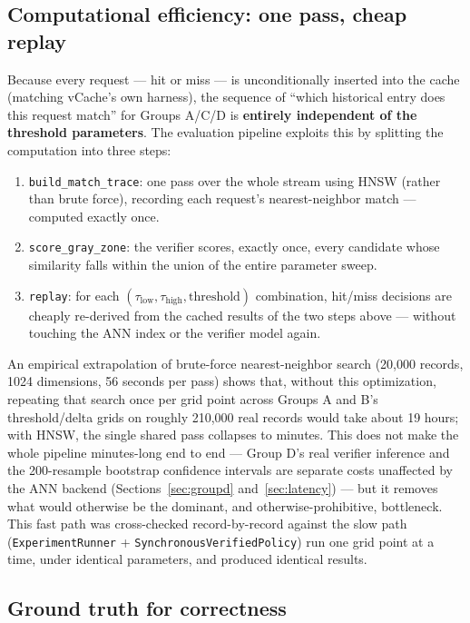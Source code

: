 \documentclass[11pt]{article}
\newcommand{\taulow}{\ensuremath{\tau_{\text{low}}}}
\newcommand{\tauhigh}{\ensuremath{\tau_{\text{high}}}}
\begin{document}
\subsection{Computational efficiency: one pass, cheap replay}

Because every request --- hit or miss --- is unconditionally inserted into the cache (matching vCache's own harness), the sequence of ``which historical entry does this request match'' for Groups A/C/D is \textbf{entirely independent of the threshold parameters}. The evaluation pipeline exploits this by splitting the computation into three steps:

\begin{enumerate}[leftmargin=*]
  \item \texttt{build\_\allowbreak{}match\_\allowbreak{}trace}: one pass over the whole stream using HNSW (rather than brute force), recording each request's nearest-neighbor match --- computed exactly once.
  \item \texttt{score\_\allowbreak{}gray\_\allowbreak{}zone}: the verifier scores, exactly once, every candidate whose similarity falls within the union of the entire parameter sweep.
  \item \texttt{replay}: for each $(\taulow, \tauhigh, \text{threshold})$ combination, hit/miss decisions are cheaply re-derived from the cached results of the two steps above --- without touching the ANN index or the verifier model again.
\end{enumerate}

An empirical extrapolation of brute-force nearest-neighbor search (20{,}000 records, 1024 dimensions, 56 seconds per pass) shows that, without this optimization, repeating that search once per grid point across Groups A and B's threshold/delta grids on roughly 210{,}000 real records would take about 19 hours; with HNSW, the single shared pass collapses to minutes. This does not make the whole pipeline minutes-long end to end --- Group D's real verifier inference and the 200-resample bootstrap confidence intervals are separate costs unaffected by the ANN backend (Sections~\ref{sec:groupd} and~\ref{sec:latency}) --- but it removes what would otherwise be the dominant, and otherwise-prohibitive, bottleneck. This fast path was cross-checked record-by-record against the slow path (\texttt{Experiment\allowbreak{}Runner} + \texttt{Synchronous\allowbreak{}Verified\allowbreak{}Policy}) run one grid point at a time, under identical parameters, and produced identical results.

\subsection{Ground truth for correctness}
\end{document}
